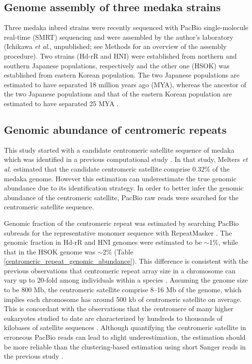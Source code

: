 \subsection*{Genome assembly of three medaka strains}
  Three medaka inbred strains were recently sequenced with PacBio single-molecule real-time (SMRT) sequencing and were assembled by the author's laboratory (Ichikawa \textit{et al}., unpublished; see Methods for an overview of the assembly procedure). Two strains (Hd-rR and HNI) were established from northern and southern Japanese populations, respectively and the other one (HSOK) was established from eastern Korean population. The two Japanese populations are estimated to have separated 18 million years ago (MYA), whereas the ancestor of the two Japanese populations and that of the eastern Korean population are estimated to have separated 25 MYA \cite{Setiamarga2009}.



\subsection*{Genomic abundance of centromeric repeats}
  This study started with a candidate centromeric satellite sequence of medaka which was identified in a previous computational study \cite{Melters2013}. In that study, Melters \textit{et al.} estimated that the candidate centromeric satellite comprise 0.32\% of the medaka genome. However this estimation can underestimate the true genomic abundance due to its identification strategy. In order to better infer the genomic abundance of the centromeric satellite, PacBio raw reads were searched for the centromeric satellite sequence.

  Genomic fraction of the centromeric repeat was estimated by searching PacBio subreads for the representative monomer sequence with RepeatMasker \cite{}. The genomic fraction in Hd-rR and HNI genomes were estimated to be $\sim$1\%, while that in the HSOK genome was $\sim$2\% (Table \ref{centromeric_repeat_genomic_abundance}). This difference is consistent with the previous observations that centromeric repeat array size in a chromosome can vary up to 20-fold among individuals within a species \cite{Miga2014}. Assuming the genome size to be 800 Mb, the centromeric satellite comprise 8--16 Mb of the genome, which implies each chromosome has around 500 kb of centromeric satellite on average. This is concordant with the observations that the centromere of many higher eukaryotes studied to date are characterized by hundreds to thousands of kilobases of satellite sequences \cite{Plohl2014}. Although quantifying the centromeric satellite in erroneous PacBio reads can lead to slight underestimation, the estimation should be more reliable than the clustering-based estimation using short Sanger reads in the previous study \cite{Melters2013}.

